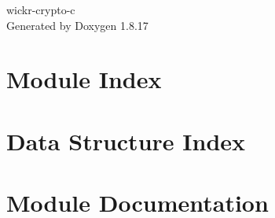 \let\mypdfximage\pdfximage\def\pdfximage{\immediate\mypdfximage}\documentclass[twoside]{book}
\newcommand{\+}{\discretionary{\mbox{\scriptsize$\hookleftarrow$}}{}{}}
\newcommand{\clearemptydoublepage}{%
  \newpage{\pagestyle{empty}\cleardoublepage}%
}
\begin{document}
\hypersetup{pageanchor=false,
             bookmarksnumbered=true,
             pdfencoding=unicode
            }
\begin{titlepage}
\vspace*{7cm}
\begin{center}%
{\Large wickr-\/crypto-\/c }\\
\vspace*{1cm}
{\large Generated by Doxygen 1.8.17}\\
\end{center}
\end{titlepage}
\clearemptydoublepage
{}
\tableofcontents
\clearemptydoublepage
{}
\hypersetup{pageanchor=true}

\chapter{Module Index}

\chapter{Data Structure Index}

\chapter{Module Documentation}



































\end{document}
